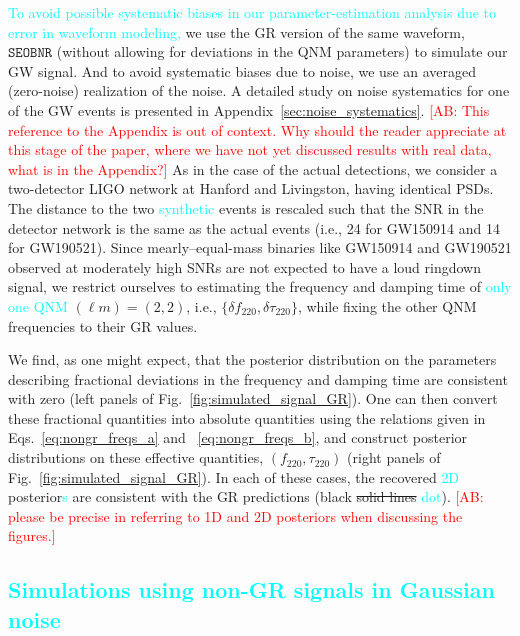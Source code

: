 \documentclass[twocolumn,prd,aps,superscriptaddress,preprintnumbers,tightenlines,showpacs,nofootinbib,eqsecnum,amsfonts,amsmath]{revtex4-1}
\newcommand{\ab}[1]{\textcolor{cyan}{#1}}
\newcommand{\comment}[1]{\textcolor{red}{[#1]}}
\newcommand{\df}[1]{\delta f_{\text{#1}}}
\newcommand{\dtau}[1]{\delta \tau_{\text{#1}}}
\newcommand{\fngr}[1]{f_{\text{#1}}}
\newcommand{\taungr}[1]{\tau_{\text{#1}}}
\newcommand{\SEOB}{\texttt{SEOBNR}}
\begin{document}

\ab{To avoid possible systematic biases in our parameter-estimation analysis 
due to error in waveform modeling,} we use the GR version of the same waveform,
$\SEOB$ (without allowing for deviations in the QNM parameters) to
simulate our GW signal. And to avoid systematic biases due to noise,
we use an averaged (zero-noise) realization of the noise. A detailed
study on noise systematics for one of the GW events is presented in
Appendix~\ref{sec:noise_systematics}. \comment{AB: This reference to the Appendix is out of context. 
Why should the reader appreciate at this stage of the paper, where we have not yet 
discussed results with real data, what is in the Appendix?} As in the case of the actual
detections, we consider a two-detector LIGO network at
Hanford and Livingston, having identical PSDs. The distance to the two
\ab{synthetic} events is rescaled such that the SNR in the detector network
is the same as the actual events (i.e., 24 for GW150914 and 14 
for GW190521). Since mearly--equal-mass binaries like GW150914 and
GW190521 observed at moderately high SNRs are not expected to have a
loud ringdown signal, we restrict ourselves to estimating the
frequency and damping time of \ab{only one QNM} $(\ell m) = (2,2)$, i.e.,
$\{\df{220},\dtau{220}\}$, while fixing the other QNM frequencies to
their GR values.

We find, as one might expect, that the posterior distribution on the
parameters describing fractional deviations in the frequency and
damping time are consistent with zero (left panels of
Fig.~\ref{fig:simulated_signal_GR}). One can then convert these
fractional quantities into absolute quantities using the relations
given in Eqs.~\ref{eq:nongr_freqs_a} and ~\ref{eq:nongr_freqs_b}, and
construct posterior distributions on these effective quantities,
$(\fngr{220}, \taungr{220})$ (right panels of
Fig.~\ref{fig:simulated_signal_GR}). In each of these cases, the recovered
\ab{2D} posterior{\ab{s} are consistent with the GR predictions 
(black \sout{solid lines} \ab{dot}). \comment{AB: please be precise in referring 
to 1D and 2D posteriors when discussing the figures.}}


\subsection{\ab{Simulations using non-GR signals in Gaussian noise}} \label{ssec:ngr_signal}
\end{document}
